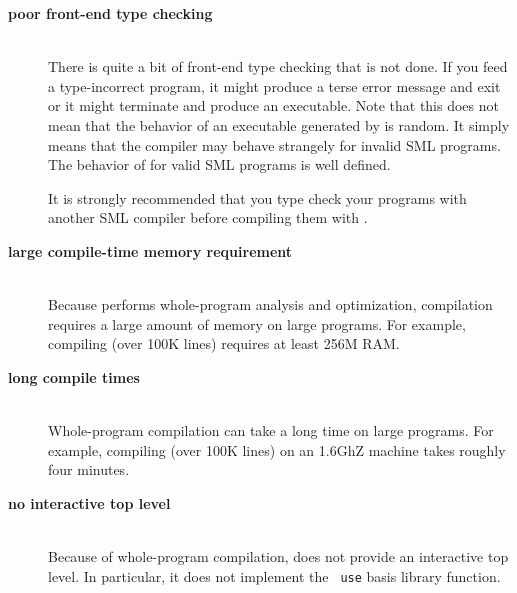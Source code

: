 
\newcommand{\drawback}[1]{\item[\bf #1]\hspace{1in}\\}

\begin{description}

\drawback{poor front-end type checking}
There is quite a bit of front-end type checking that is not done.  If
you feed {\mlton} a type-incorrect program, it might produce a terse
error message and exit or it might terminate and produce an
executable.  Note that this does not mean that the behavior of an
executable generated by {\mlton} is random.  It simply means that the
compiler may behave strangely for invalid SML programs.  The behavior
of {\mlton} for valid SML programs is well defined.

It is strongly recommended that you type check your programs with
another SML compiler before compiling them with {\mlton}.

\drawback{large compile-time memory requirement}
Because {\mlton} performs whole-program analysis and optimization,
compilation requires a large amount of memory on large programs.  For
example, compiling {\mlton} (over 100K lines) requires at least 256M
RAM.

\drawback{long compile times}
Whole-program compilation can take a long time on large programs.  For
example, compiling {\mlton} (over 100K lines) on an 1.6GhZ machine
takes roughly four minutes.

\drawback{no interactive top level}
Because of whole-program compilation, {\mlton} does not provide an
interactive top level.  In particular, it does not implement the {\tt
use} basis library function.

\end{description}
